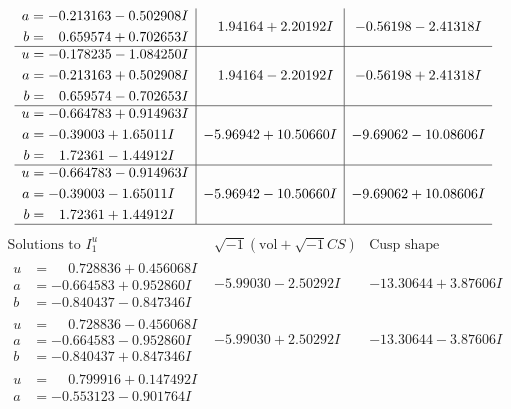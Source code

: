 \documentclass[1p]{elsarticle_modified}
\theoremstyle{definition}
\newcommand{\I}{\sqrt{-1}}
\begin{document}
$$\begin{array}{c|c|c}
\begin{aligned}
a &= -0.213163 - 0.502908 I \\
b &= \phantom{-}0.659574 + 0.702653 I\end{aligned}
 & \phantom{-}1.94164 + 2.20192 I & -0.56198 - 2.41318 I \\ \hline\begin{aligned}
u &= -0.178235 - 1.084250 I \\
a &= -0.213163 + 0.502908 I \\
b &= \phantom{-}0.659574 - 0.702653 I\end{aligned}
 & \phantom{-}1.94164 - 2.20192 I & -0.56198 + 2.41318 I \\ \hline\begin{aligned}
u &= -0.664783 + 0.914963 I \\
a &= -0.39003 + 1.65011 I \\
b &= \phantom{-}1.72361 - 1.44912 I\end{aligned}
 & -5.96942 + 10.50660 I & -9.69062 - 10.08606 I \\ \hline\begin{aligned}
u &= -0.664783 - 0.914963 I \\
a &= -0.39003 - 1.65011 I \\
b &= \phantom{-}1.72361 + 1.44912 I\end{aligned}
 & -5.96942 - 10.50660 I & -9.69062 + 10.08606 I\\
 \hline 
 \end{array}$$\newpage$$\begin{array}{c|c|c}  
\text{Solutions to }I^u_{1}& \I (\text{vol} + \sqrt{-1}CS) & \text{Cusp shape}\\
 \hline 
\begin{aligned}
u &= \phantom{-}0.728836 + 0.456068 I \\
a &= -0.664583 + 0.952860 I \\
b &= -0.840437 - 0.847346 I\end{aligned}
 & -5.99030 - 2.50292 I & -13.30644 + 3.87606 I \\ \hline\begin{aligned}
u &= \phantom{-}0.728836 - 0.456068 I \\
a &= -0.664583 - 0.952860 I \\
b &= -0.840437 + 0.847346 I\end{aligned}
 & -5.99030 + 2.50292 I & -13.30644 - 3.87606 I \\ \hline\begin{aligned}
u &= \phantom{-}0.799916 + 0.147492 I \\
a &= -0.553123 - 0.901764 I \\

\end{aligned}
\end{array}$$
\end{document}
